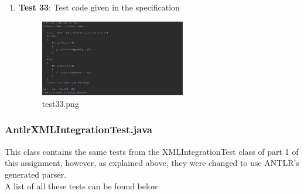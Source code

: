 \documentclass{article}
\begin{document}
\begin{enumerate}
					

					
					\item \textbf{Test 33}: Test code given in the specification
										\begin{figure}[H]
					\centering
			 			\includegraphics[width=0.6\textwidth]{test33.png}
			 			\centering
			  			\caption{test33.png}
			  			\label{fig:test33}
					\end{figure}			
			
				\end{enumerate}
				
				\pagebreak
			
			\subsubsection{AntlrXMLIntegrationTest.java}
					
					This class contains the same tests from the XMLIntegrationTest class of part 1 of this assignment, however, as explained above, they were changed to use ANTLR's generated parser.\\A list of all these tests can be found below:
					
\end{document}
